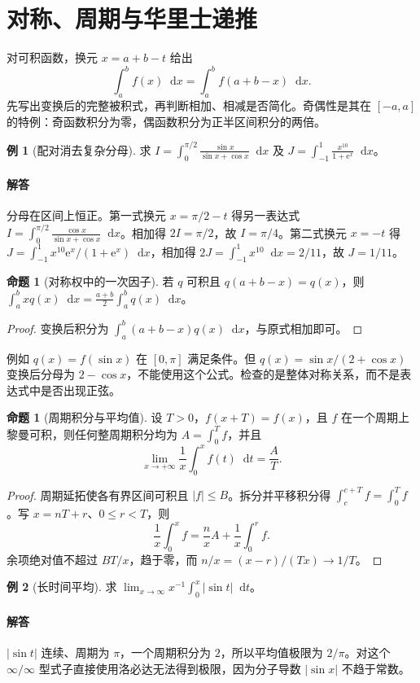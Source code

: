 \documentclass[UTF8,fontset=fandol,12pt,oneside,openany]{ctexrep}
\newcommand{\dd}{\mathop{}\!\mathrm d}
\newcommand{\ee}{\mathrm e}
\theoremstyle{definition}
\newtheorem{proposition}[theorem]{命题}
\newtheorem{example}{例}[chapter]
\begin{document}
\section{对称、周期与华里士递推}
\label{lec:11:symmetry}
对可积函数，换元 $x=a+b-t$ 给出
\[\int_a^bf(x)\dd x=\int_a^bf(a+b-x)\dd x.\]
先写出变换后的完整被积式，再判断相加、相减是否简化。奇偶性是其在 $[-a,a]$ 的特例：奇函数积分为零，偶函数积分为正半区间积分的两倍。
\begin{example}[配对消去复杂分母]
求 $I=\int_0^{\pi/2}\frac{\sin x}{\sin x+\cos x}\dd x$ 及 $J=\int_{-1}^1\frac{x^{10}}{1+\ee^x}\dd x$。
\end{example}
\paragraph{解答} 分母在区间上恒正。第一式换元 $x=\pi/2-t$ 得另一表达式 $I=\int_0^{\pi/2}\frac{\cos x}{\sin x+\cos x}\dd x$。相加得 $2I=\pi/2$，故 $I=\pi/4$。第二式换元 $x=-t$ 得 $J=\int_{-1}^1x^{10}\ee^x/(1+\ee^x)\dd x$，相加得 $2J=\int_{-1}^1x^{10}\dd x=2/11$，故 $J=1/11$。
\begin{proposition}[对称权中的一次因子]
若 $q$ 可积且 $q(a+b-x)=q(x)$，则 $\int_a^b xq(x)\dd x=\frac{a+b}2\int_a^bq(x)\dd x$。
\end{proposition}
\begin{proof}
变换后积分为 $\int_a^b(a+b-x)q(x)\dd x$，与原式相加即可。
\end{proof}
例如 $q(x)=f(\sin x)$ 在 $[0,\pi]$ 满足条件。但 $q(x)=\sin x/(2+\cos x)$ 变换后分母为 $2-\cos x$，不能使用这个公式。检查的是整体对称关系，而不是表达式中是否出现正弦。

\begin{proposition}[周期积分与平均值]
设 $T>0$，$f(x+T)=f(x)$，且 $f$ 在一个周期上黎曼可积，则任何整周期积分均为 $A=\int_0^Tf$，并且
\[\lim_{x\to+\infty}\frac1x\int_0^xf(t)\dd t=\frac AT.\]
\end{proposition}
\begin{proof}
周期延拓使各有界区间可积且 $|f|\le B$。拆分并平移积分得 $\int_c^{c+T}f=\int_0^Tf$。写 $x=nT+r$、$0\le r<T$，则
\[\frac1x\int_0^xf=\frac nxA+\frac1x\int_0^rf.\]
余项绝对值不超过 $BT/x$，趋于零，而 $n/x=(x-r)/(Tx)\to1/T$。
\end{proof}
\begin{example}[长时间平均]
求 $\lim_{x\to\infty}x^{-1}\int_0^x|\sin t|\dd t$。
\end{example}
\paragraph{解答} $|\sin t|$ 连续、周期为 $\pi$，一个周期积分为 $2$，所以平均值极限为 $2/\pi$。对这个 $\infty/\infty$ 型式子直接使用洛必达无法得到极限，因为分子导数 $|\sin x|$ 不趋于常数。
\end{document}
